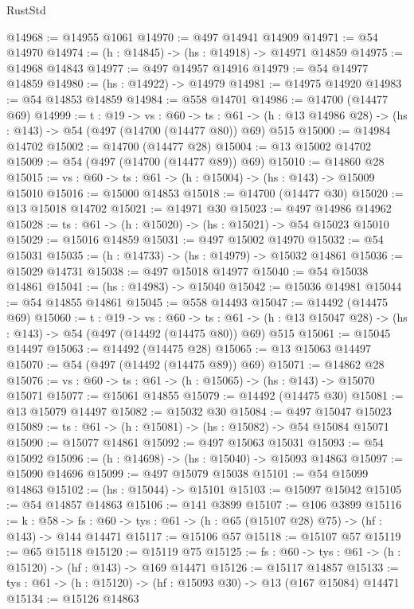 \begin{lexlean}{RustStd}
\begin{coremodule}
@14968 := @14955 @1061
@14970 := @497 @14941 @14909
@14971 := @54 @14970
@14974 := (h : @14845) -> (hs : @14918) -> @14971 @14859
@14975 := @14968 @14843
@14977 := @497 @14957 @14916
@14979 := @54 @14977 @14859
@14980 := (hs : @14922) -> @14979
@14981 := @14975 @14920
@14983 := @54 @14853 @14859
@14984 := @558 @14701
@14986 := @14700 (@14477 @69)
@14999 := {t : @19} ->
  {vs : @60} ->
  {ts : @61} -> (h : @13 @14986 @28) -> (hs : @143) -> @54 (@497 (@14700 (@14477 @80)) @69) @515
@15000 := @14984 @14702
@15002 := @14700 (@14477 @28)
@15004 := @13 @15002 @14702
@15009 := @54 (@497 (@14700 (@14477 @89)) @69)
@15010 := @14860 @28
@15015 := {vs : @60} -> {ts : @61} -> (h : @15004) -> (hs : @143) -> @15009 @15010
@15016 := @15000 @14853
@15018 := @14700 (@14477 @30)
@15020 := @13 @15018 @14702
@15021 := @14971 @30
@15023 := @497 @14986 @14962
@15028 := {ts : @61} -> (h : @15020) -> (hs : @15021) -> @54 @15023 @15010
@15029 := @15016 @14859
@15031 := @497 @15002 @14970
@15032 := @54 @15031
@15035 := (h : @14733) -> (hs : @14979) -> @15032 @14861
@15036 := @15029 @14731
@15038 := @497 @15018 @14977
@15040 := @54 @15038 @14861
@15041 := (hs : @14983) -> @15040
@15042 := @15036 @14981
@15044 := @54 @14855 @14861
@15045 := @558 @14493
@15047 := @14492 (@14475 @69)
@15060 := {t : @19} ->
  {vs : @60} ->
  {ts : @61} -> (h : @13 @15047 @28) -> (hs : @143) -> @54 (@497 (@14492 (@14475 @80)) @69) @515
@15061 := @15045 @14497
@15063 := @14492 (@14475 @28)
@15065 := @13 @15063 @14497
@15070 := @54 (@497 (@14492 (@14475 @89)) @69)
@15071 := @14862 @28
@15076 := {vs : @60} -> {ts : @61} -> (h : @15065) -> (hs : @143) -> @15070 @15071
@15077 := @15061 @14855
@15079 := @14492 (@14475 @30)
@15081 := @13 @15079 @14497
@15082 := @15032 @30
@15084 := @497 @15047 @15023
@15089 := {ts : @61} -> (h : @15081) -> (hs : @15082) -> @54 @15084 @15071
@15090 := @15077 @14861
@15092 := @497 @15063 @15031
@15093 := @54 @15092
@15096 := (h : @14698) -> (hs : @15040) -> @15093 @14863
@15097 := @15090 @14696
@15099 := @497 @15079 @15038
@15101 := @54 @15099 @14863
@15102 := (hs : @15044) -> @15101
@15103 := @15097 @15042
@15105 := @54 @14857 @14863
@15106 := @141 @3899
@15107 := @106 @3899
@15116 := {k : @58} ->
  {fs : @60} -> {tys : @61} -> (h : @65 (@15107 @28) @75) -> (hf : @143) -> @144 @14471
@15117 := @15106 @57
@15118 := @15107 @57
@15119 := @65 @15118
@15120 := @15119 @75
@15125 := {fs : @60} -> {tys : @61} -> (h : @15120) -> (hf : @143) -> @169 @14471
@15126 := @15117 @14857
@15133 := {tys : @61} -> (h : @15120) -> (hf : @15093 @30) -> @13 (@167 @15084) @14471
@15134 := @15126 @14863

\end{coremodule}
\end{lexlean}
